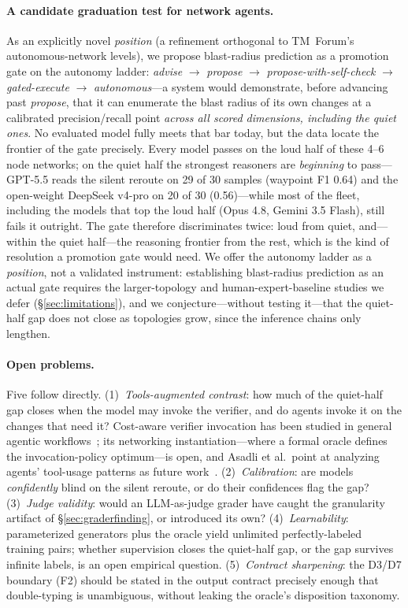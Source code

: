 \documentclass[11pt]{article}
\begin{document}
\paragraph{A candidate graduation test for network agents.} As an
explicitly novel \emph{position} (a refinement orthogonal to TM~Forum's
autonomous-network levels), we propose blast-radius prediction as a
promotion gate on the autonomy ladder: \emph{advise}
$\rightarrow$ \emph{propose} $\rightarrow$ \emph{propose-with-self-check}
$\rightarrow$ \emph{gated-execute} $\rightarrow$ \emph{autonomous}---a
system would demonstrate, before advancing past \emph{propose}, that it can
enumerate the blast radius of its own changes at a calibrated
precision/recall point \emph{across all scored dimensions, including the
quiet ones}. No evaluated model fully meets that bar today, but the data
locate the frontier of the gate precisely. Every model passes on the loud
half of these 4--6 node networks; on the quiet half the strongest reasoners
are \emph{beginning} to pass---GPT-5.5 reads the silent reroute on 29 of 30
samples (waypoint F1 0.64) and the open-weight DeepSeek v4-pro on 20 of 30
(0.56)---while most of the fleet, including the models that top the loud
half (Opus 4.8, Gemini 3.5 Flash), still fails it outright. The gate
therefore discriminates twice: loud from quiet, and---within the quiet
half---the reasoning frontier from the rest, which is the kind of resolution
a promotion gate would need. We offer the autonomy ladder as a \emph{position},
not a validated instrument: establishing blast-radius prediction as an actual
gate requires the larger-topology and human-expert-baseline studies we defer
(\S\ref{sec:limitations}), and we conjecture---without testing it---that the
quiet-half gap does not close as topologies grow, since the inference chains
only lengthen.

\paragraph{Open problems.} Five follow directly. (1)~\emph{Tools-augmented
contrast}: how much of the quiet-half gap closes when the model may invoke
the verifier, and do agents invoke it on the changes that need it?
Cost-aware verifier invocation has been studied in general agentic
workflows~\cite{sherlock}; its networking instantiation---where a formal
oracle defines the invocation-policy optimum---is open, and Asadli et al.\
point at analyzing agents' tool-usage patterns as future
work~\cite{ethagentic}. (2)~\emph{Calibration}: are models
\emph{confidently} blind on the silent reroute, or do their confidences
flag the gap? (3)~\emph{Judge validity}: would an LLM-as-judge grader have
caught the granularity artifact of \S\ref{sec:graderfinding}, or introduced
its own? (4)~\emph{Learnability}: parameterized generators plus the oracle
yield unlimited perfectly-labeled training pairs; whether supervision
closes the quiet-half gap, or the gap survives infinite labels, is an open
empirical question. (5)~\emph{Contract sharpening}: the D3/D7 boundary
(F2) should be stated in the output contract precisely enough that
double-typing is unambiguous, without leaking the oracle's disposition
taxonomy.
\end{document}
